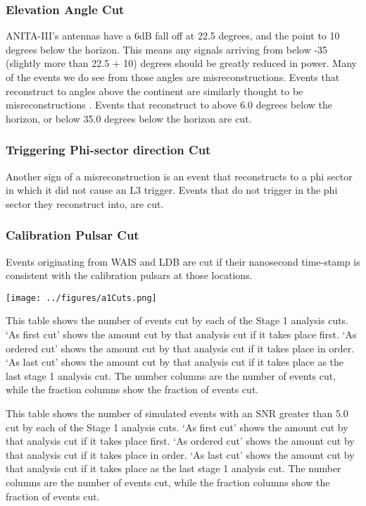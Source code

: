 \subsubsection{Elevation Angle Cut}

ANITA-III's antennas have a 6dB fall off at 22.5 degrees, and the point to 10 degrees below the horizon.  This means any signals arriving from below -35 (slightly more than 22.5 + 10) degrees should be greatly reduced in power.  Many of the events we do see from those angles are misreconstructions.   Events that reconstruct to angles above the continent are similarly thought to be misreconstructions \cite{abby}.  Events that reconstruct to above 6.0 degrees below the horizon, or below 35.0 degrees below the horizon are cut.

\subsubsection{Triggering Phi-sector direction Cut}

Another sign of a misreconstruction is an event that reconstructs to a phi sector in which it did not cause an L3 trigger.  Events that do not trigger in the phi sector they reconstruct into, are cut. 

\subsubsection{Calibration Pulsar Cut}

Events originating from WAIS and LDB are cut if their nanosecond time-stamp is consistent with the calibration pulsars at those locations.

\begin{table}[h]
\centering
\texttt{[image: ../figures/a1Cuts.png]}
\caption[Stage 1 Analysis Cuts Table]{This table shows the number of events cut by each of the Stage 1 analysis cuts.  `As first cut' shows the amount cut by that analysis cut if it takes place first.  `As ordered cut' shows the amount cut by that analysis cut if it takes place in order.  `As last cut' shows the amount cut by that analysis cut if it takes place as the last stage 1 analysis cut.  The number columns are the number of events cut, while the fraction columns show the fraction of events cut.}
\label{tab:a1cuts}
\end{table}

\begin{table}[h]
\centering
{}
\caption[Stage 1 Analysis Cuts Table for Simulated Events]{This table shows the number of simulated events with an SNR greater than 5.0 cut by each of the Stage 1 analysis cuts.  `As first cut' shows the amount cut by that analysis cut if it takes place first.  `As ordered cut' shows the amount cut by that analysis cut if it takes place in order.  `As last cut' shows the amount cut by that analysis cut if it takes place as the last stage 1 analysis cut.  The number columns are the number of events cut, while the fraction columns show the fraction of events cut.}
\label{tab:a1cutsSim}
\end{table}
  
